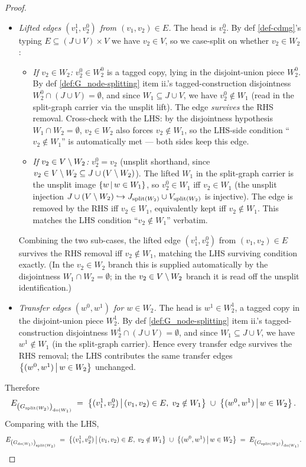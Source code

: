 \documentclass[main]{subfiles}
\begin{document}
\begin{proof}
\begin{itemize}
    \item \emph{Lifted edges $(v_1^1, v_2^0)$ from $(v_1, v_2) \in E$.}
    The head is $v_2^0$. By def \ref{def-cdmg}'s typing $E \subseteq (J \cup V) \times V$ we have $v_2 \in V$, so we case-split on whether $v_2 \in W_2$:
    \begin{itemize}
        \item \emph{If $v_2 \in W_2$:} $v_2^0 \in W_2^0$ is a tagged copy, lying in the disjoint-union piece $W_2^0$. By def \ref{def:G_node-splitting} item ii.'s tagged-construction disjointness $W_2^0 \cap (J \cup V) = \emptyset$, and since $W_1 \subseteq J \cup V$, we have $v_2^0 \notin W_1$ (read in the split-graph carrier via the unsplit lift). The edge \emph{survives} the RHS removal. Cross-check with the LHS: by the disjointness hypothesis $W_1 \cap W_2 = \emptyset$, $v_2 \in W_2$ also forces $v_2 \notin W_1$, so the LHS-side condition ``$v_2 \notin W_1$'' is automatically met --- both sides keep this edge.
        \item \emph{If $v_2 \in V \setminus W_2$:} $v_2^0 = v_2$ (unsplit shorthand, since $v_2 \in V \setminus W_2 \subseteq J \cup (V \setminus W_2)$). The lifted $W_1$ in the split-graph carrier is the unsplit image $\left \{ w \,\middle|\, w \in W_1 \right \}$, so $v_2^0 \in W_1$ iff $v_2 \in W_1$ (the unsplit injection $J \cup (V \setminus W_2) \hookrightarrow J_{\mathrm{split}(W_2)} \cup V_{\mathrm{split}(W_2)}$ is injective). The edge is removed by the RHS iff $v_2 \in W_1$, equivalently kept iff $v_2 \notin W_1$. This matches the LHS condition ``$v_2 \notin W_1$'' verbatim.
    \end{itemize}
    Combining the two sub-cases, the lifted edge $(v_1^1, v_2^0)$ from $(v_1, v_2) \in E$ survives the RHS removal iff $v_2 \notin W_1$, matching the LHS surviving condition exactly. (In the $v_2 \in W_2$ branch this is supplied automatically by the disjointness $W_1 \cap W_2 = \emptyset$; in the $v_2 \in V \setminus W_2$ branch it is read off the unsplit identification.)
    \item \emph{Transfer edges $(w^0, w^1)$ for $w \in W_2$.}
    The head is $w^1 \in W_2^1$, a tagged copy in the disjoint-union piece $W_2^1$. By def \ref{def:G_node-splitting} item ii.'s tagged-construction disjointness $W_2^1 \cap (J \cup V) = \emptyset$, and since $W_1 \subseteq J \cup V$, we have $w^1 \notin W_1$ (in the split-graph carrier). Hence every transfer edge survives the RHS removal; the LHS contributes the same transfer edges $\left \{ (w^0, w^1) \,\middle|\, w \in W_2 \right \}$ unchanged.
\end{itemize}
Therefore
\[
    E_{\left ( G_{\mathrm{split}(W_2)} \right )_{\operatorname{do}(W_1)}}
    \;=\; \left \{ (v_1^1, v_2^0) \,\middle|\, (v_1, v_2) \in E,\; v_2 \notin W_1 \right \} \;\cup\; \left \{ (w^0, w^1) \,\middle|\, w \in W_2 \right \}.
\]
Comparing with the LHS,
\[
    E_{\left ( G_{\operatorname{do}(W_1)} \right )_{\mathrm{split}(W_2)}}
    \;=\; \left \{ (v_1^1, v_2^0) \,\middle|\, (v_1, v_2) \in E,\; v_2 \notin W_1 \right \} \;\cup\; \left \{ (w^0, w^1) \,\middle|\, w \in W_2 \right \}
    \;=\; E_{\left ( G_{\mathrm{split}(W_2)} \right )_{\operatorname{do}(W_1)}}.
\]
\checkmark


\end{proof}
\end{document}
